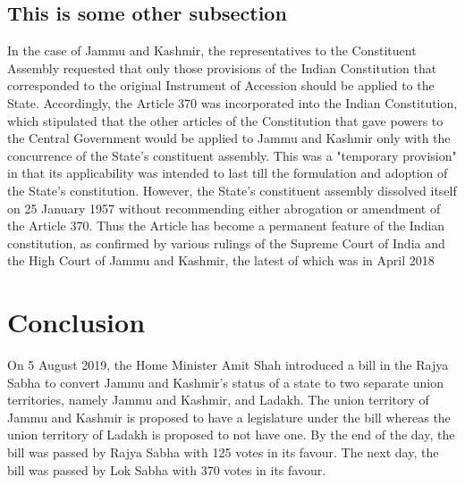 \documentclass[a4paper,onecolumn]{article}
\begin{document}
	 \subsection{This is some other subsection}
	 In the case of Jammu and Kashmir, the representatives to the Constituent Assembly requested that only those provisions of the Indian Constitution that corresponded to the original Instrument of Accession should be applied to the State. Accordingly, the Article 370 was incorporated into the Indian Constitution, which stipulated that the other articles of the Constitution that gave powers to the Central Government would be applied to Jammu and Kashmir only with the concurrence of the State's constituent assembly. This was a "temporary provision" in that its applicability was intended to last till the formulation and adoption of the State's constitution. However, the State's constituent assembly dissolved itself on 25 January 1957 without recommending either abrogation or amendment of the Article 370. Thus the Article has become a permanent feature of the Indian constitution, as confirmed by various rulings of the Supreme Court of India and the High Court of Jammu and Kashmir, the latest of which was in April 2018
\section{Conclusion}
On 5 August 2019, the Home Minister Amit Shah introduced a bill in the Rajya Sabha to convert Jammu and Kashmir's status of a state to two separate union territories, namely Jammu and Kashmir, and Ladakh. The union territory of Jammu and Kashmir is proposed to have a legislature under the bill whereas the union territory of Ladakh is proposed to not have one. By the end of the day, the bill was passed by Rajya Sabha with 125 votes in its favour. The next day, the bill was passed by Lok Sabha with 370 votes in its favour.
\end{document}
